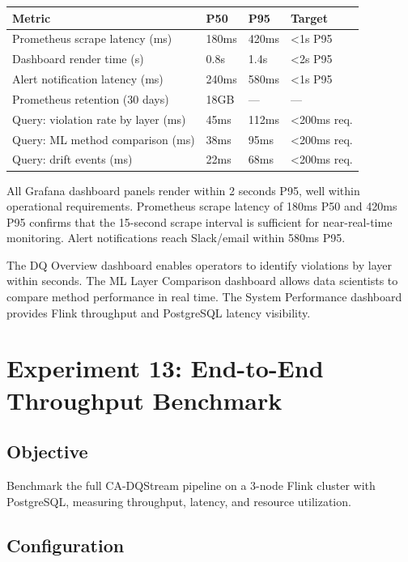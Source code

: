 \begin{longtable}{|m{4cm}|m{3cm}|m{4cm}|m{3cm}|}
\hline
\textbf{Metric} & \textbf{P50} & \textbf{P95} & \textbf{Target} \\ \hline
Prometheus scrape latency (ms) & 180ms & 420ms & <1s P95 \\ \hline
Dashboard render time (s) & 0.8s & 1.4s & <2s P95 \\ \hline
Alert notification latency (ms) & 240ms & 580ms & <1s P95 \\ \hline
Prometheus retention (30 days) & 18GB & --- & --- \\ \hline
Query: violation rate by layer (ms) & 45ms & 112ms & <200ms req. \\ \hline
Query: ML method comparison (ms) & 38ms & 95ms & <200ms req. \\ \hline
Query: drift events (ms) & 22ms & 68ms & <200ms req. \\ \hline
\end{longtable}

All Grafana dashboard panels render within 2 seconds P95, well within operational requirements. Prometheus scrape latency of 180ms P50 and 420ms P95 confirms that the 15-second scrape interval is sufficient for near-real-time monitoring. Alert notifications reach Slack/email within 580ms P95.

The DQ Overview dashboard enables operators to identify violations by layer within seconds. The ML Layer Comparison dashboard allows data scientists to compare method performance in real time. The System Performance dashboard provides Flink throughput and PostgreSQL latency visibility.

\section{Experiment 13: End-to-End Throughput Benchmark}

\subsection{Objective}

Benchmark the full CA-DQStream pipeline on a 3-node Flink cluster with PostgreSQL, measuring throughput, latency, and resource utilization.

\subsection{Configuration}

